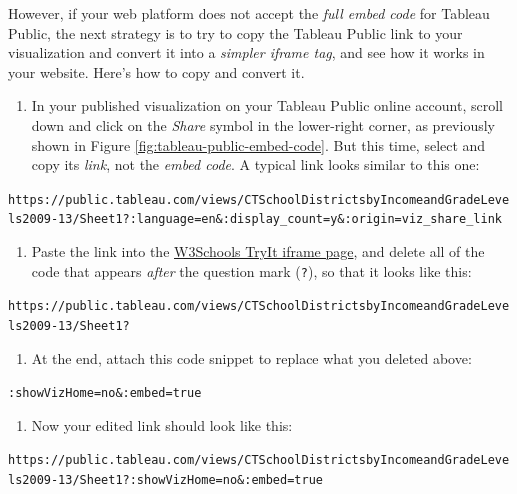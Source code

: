 \documentclass[
  english,
]{book}
\providecommand{\tightlist}{%
  \setlength{\itemsep}{0pt}\setlength{\parskip}{0pt}}
\begin{document}
However, if your web platform does not accept the \emph{full embed code} for Tableau Public, the next strategy is to try to copy the Tableau Public link to your visualization and convert it into a \emph{simpler iframe tag}, and see how it works in your website. Here's how to copy and convert it.

\begin{enumerate}
\def\labelenumi{\arabic{enumi}.}
\tightlist
\item
  In your published visualization on your Tableau Public online account, scroll down and click on the \emph{Share} symbol in the lower-right corner, as previously shown in Figure \ref{fig:tableau-public-embed-code}. But this time, select and copy its \emph{link}, not the \emph{embed code}. A typical link looks similar to this one:
\end{enumerate}

\texttt{https://public.tableau.com/views/CTSchoolDistrictsbyIncomeandGradeLevels2009-13/Sheet1?:language=en\&:display\_count=y\&:origin=viz\_share\_link}

\begin{enumerate}
\def\labelenumi{\arabic{enumi}.}
\setcounter{enumi}{1}
\tightlist
\item
  Paste the link into the \href{https://www.w3schools.com/tags/tryit.asp?filename=tryhtml_iframe}{W3Schools TryIt iframe page}, and delete all of the code that appears \emph{after} the question mark (\texttt{?}), so that it looks like this:
\end{enumerate}

\texttt{https://public.tableau.com/views/CTSchoolDistrictsbyIncomeandGradeLevels2009-13/Sheet1?}

\begin{enumerate}
\def\labelenumi{\arabic{enumi}.}
\setcounter{enumi}{2}
\tightlist
\item
  At the end, attach this code snippet to replace what you deleted above:
\end{enumerate}

\texttt{:showVizHome=no\&:embed=true}

\begin{enumerate}
\def\labelenumi{\arabic{enumi}.}
\setcounter{enumi}{3}
\tightlist
\item
  Now your edited link should look like this:
\end{enumerate}

\texttt{https://public.tableau.com/views/CTSchoolDistrictsbyIncomeandGradeLevels2009-13/Sheet1?:showVizHome=no\&:embed=true}
\end{document}

